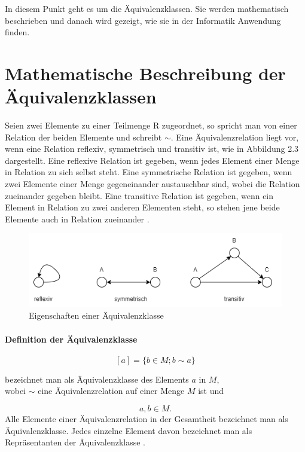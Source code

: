 In diesem Punkt geht es um die Äquivalenzklassen. Sie werden mathematisch beschrieben und danach wird gezeigt, wie sie
in der Informatik Anwendung finden.
\section*{Mathematische Beschreibung der Äquivalenzklassen}
Seien zwei Elemente zu einer Teilmenge R zugeordnet, so spricht man von einer Relation der beiden Elemente und schreibt $\sim$. 
Eine Äquivalenzrelation liegt vor, wenn eine Relation reflexiv, symmetrisch und 
transitiv ist, wie in Abbildung 2.3 dargestellt.
Eine reflexive Relation ist gegeben, wenn jedes Element einer Menge in Relation zu sich selbst steht. %
Eine symmetrische Relation ist gegeben, wenn zwei Elemente einer Menge gegeneinander austauschbar sind, wobei die Relation zueinander gegeben bleibt.
Eine transitive Relation ist gegeben, wenn ein Element in Relation zu zwei anderen Elementen steht, so stehen jene beide Elemente auch in Relation zueinander \parencite[S. 66]{equimaths}.
\begin{figure}[!h]
\centering
\includegraphics[scale=.9,]{Bilder/EquiDrawio/EigenschaftenEqui.drawio.png}
\caption{Eigenschaften einer Äquivalenzklasse \parencite{eigequi1}\parencite{eigequi2}}
\end{figure}
\newpage
\paragraph{Definition der Äquivalenzklasse}
$$[a] = \{b \in M ; b \sim a\}$$
\begin{center}
bezeichnet man als Äquivalenzklasse des Elements $a$ in $M$,\\
wobei $\sim$ eine Äquivalenzrelation auf einer Menge $M$ ist und\\
\end{center}
$$a,b \in M.$$
Alle Elemente einer Äquivalenzrelation in der Gesamtheit bezeichnet man als Äquivalenzklasse.
Jedes einzelne Element davon bezeichnet man als Repräsentanten der Äquivalenzklasse \parencite[S. 66]{equimaths}.

